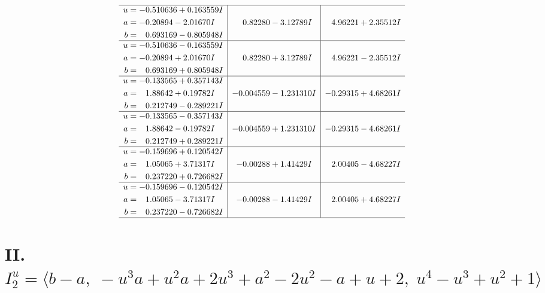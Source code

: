 \documentclass[1p]{elsarticle_modified}
\theoremstyle{definition}
\begin{document}
$$\begin{array}{c|c|c}
 \hline 
\begin{aligned}
u &= -0.510636 + 0.163559 I \\
a &= -0.20894 - 2.01670 I \\
b &= \phantom{-}0.693169 - 0.805948 I\end{aligned}
 & \phantom{-}0.82280 - 3.12789 I & \phantom{-}4.96221 + 2.35512 I \\ \hline\begin{aligned}
u &= -0.510636 - 0.163559 I \\
a &= -0.20894 + 2.01670 I \\
b &= \phantom{-}0.693169 + 0.805948 I\end{aligned}
 & \phantom{-}0.82280 + 3.12789 I & \phantom{-}4.96221 - 2.35512 I \\ \hline\begin{aligned}
u &= -0.133565 + 0.357143 I \\
a &= \phantom{-}1.88642 + 0.19782 I \\
b &= \phantom{-}0.212749 - 0.289221 I\end{aligned}
 & -0.004559 - 1.231310 I & -0.29315 + 4.68261 I \\ \hline\begin{aligned}
u &= -0.133565 - 0.357143 I \\
a &= \phantom{-}1.88642 - 0.19782 I \\
b &= \phantom{-}0.212749 + 0.289221 I\end{aligned}
 & -0.004559 + 1.231310 I & -0.29315 - 4.68261 I \\ \hline\begin{aligned}
u &= -0.159696 + 0.120542 I \\
a &= \phantom{-}1.05065 + 3.71317 I \\
b &= \phantom{-}0.237220 + 0.726682 I\end{aligned}
 & -0.00288 + 1.41429 I & \phantom{-}2.00405 - 4.68227 I \\ \hline\begin{aligned}
u &= -0.159696 - 0.120542 I \\
a &= \phantom{-}1.05065 - 3.71317 I \\
b &= \phantom{-}0.237220 - 0.726682 I\end{aligned}
 & -0.00288 - 1.41429 I & \phantom{-}2.00405 + 4.68227 I\\
 \hline 
 \end{array}$$\newpage\newpage\renewcommand{\arraystretch}{1}
\centering \section*{II. $I^u_{2}= \langle b- a,\;- u^3 a+u^2 a+2 u^3+a^2-2 u^2- a+u+2,\;u^4- u^3+u^2+1 \rangle$}
\end{document}
